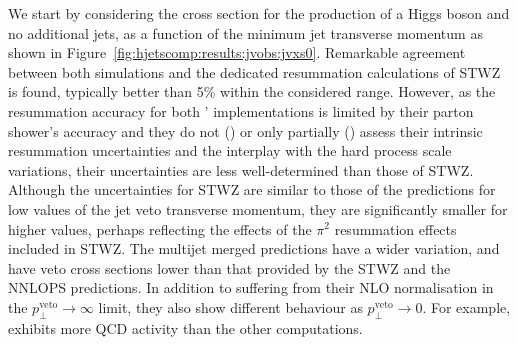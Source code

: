 {We start by considering 
the cross section for the production of a Higgs boson and no 
additional jets, as a function of the minimum jet transverse momentum 
as shown in Figure~\ref{fig:hjetscomp:results:jvobs:jvxs0}. Remarkable 
agreement between both \NNLOPS simulations and the dedicated resummation 
calculations of STWZ is found, typically better than 5\% within the considered range. 
However, as the resummation accuracy for both \NNLOPS' implementations is limited by their parton 
shower's accuracy and they do not (\Powheg) or only partially (\Sherpa) 
assess their intrinsic resummation uncertainties and the interplay with the hard process 
scale variations, their uncertainties are less well-determined than those of STWZ. Although
the uncertainties for STWZ are similar to those of the \NNLOPS predictions for low values of the
jet veto transverse momentum, they are significantly smaller for higher values, perhaps reflecting the
effects of the $\pi^2$ resummation effects included in STWZ.
 The multijet merged predictions have a wider variation, and have veto cross sections lower than
that provided by the STWZ and the NNLOPS predictions. In addition to 
suffering from their NLO normalisation in the $p_\perp^\text{veto}\to\infty$ 
limit, they also show different behaviour as $p_\perp^\text{veto}\to 0$. For example, 
\Sherpa \MEPSatNLO exhibits more QCD activity than the other computations. 

}
